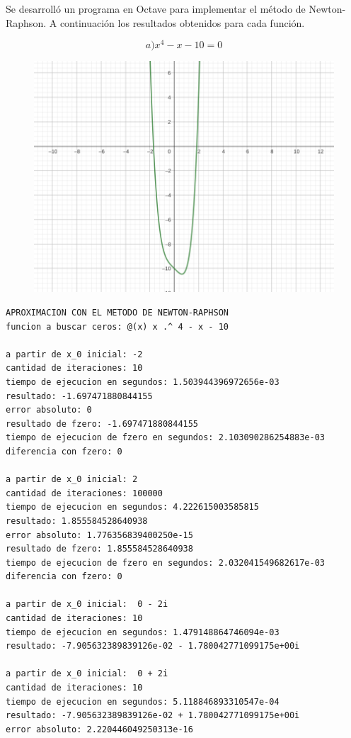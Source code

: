 \documentclass{article}
\begin{document}
Se desarrolló un programa en Octave para implementar el método de Newton-Raphson. A continuación los resultados obtenidos para cada función. 

\[a) x^4 - x -10 = 0\]
\begin{figure}[H]
    \centering
    \includegraphics[width=0.65\linewidth]{a.png}
    \label{fig:enter-label}
    \caption{}
\end{figure}
\begin{lstlisting}
APROXIMACION CON EL METODO DE NEWTON-RAPHSON
funcion a buscar ceros: @(x) x .^ 4 - x - 10

a partir de x_0 inicial: -2
cantidad de iteraciones: 10
tiempo de ejecucion en segundos: 1.503944396972656e-03
resultado: -1.697471880844155
error absoluto: 0
resultado de fzero: -1.697471880844155
tiempo de ejecucion de fzero en segundos: 2.103090286254883e-03
diferencia con fzero: 0

a partir de x_0 inicial: 2
cantidad de iteraciones: 100000
tiempo de ejecucion en segundos: 4.222615003585815
resultado: 1.855584528640938
error absoluto: 1.776356839400250e-15
resultado de fzero: 1.855584528640938
tiempo de ejecucion de fzero en segundos: 2.032041549682617e-03
diferencia con fzero: 0   

a partir de x_0 inicial:  0 - 2i
cantidad de iteraciones: 10
tiempo de ejecucion en segundos: 1.479148864746094e-03
resultado: -7.905632389839126e-02 - 1.780042771099175e+00i

a partir de x_0 inicial:  0 + 2i
cantidad de iteraciones: 10
tiempo de ejecucion en segundos: 5.118846893310547e-04
resultado: -7.905632389839126e-02 + 1.780042771099175e+00i
error absoluto: 2.220446049250313e-16
\end{lstlisting}
\end{document}
